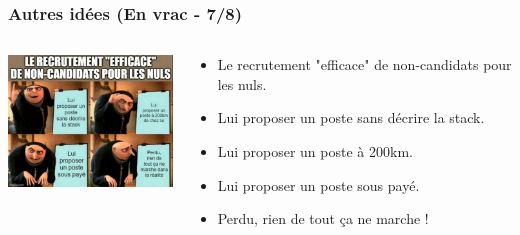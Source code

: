 \documentclass[slidetop,11pt]{beamer}
\begin{document}
\begin{frame}
	\frametitle{Autres id{\'e}es (En vrac - 7/8)}
	\begin{columns}[T]
	\begin{column}[T]{5cm}
		\includegraphics[width=5cm]{img/1687203978939.jpeg}~\\
	\end{column}
	\begin{column}[T]{8cm}
		\begin{itemize}
			\item Le recrutement "efficace" de non-candidats pour les nuls.~\newline
			\item Lui proposer un poste sans d{\'e}crire la stack. 
			\item Lui proposer un poste {\`a} 200km. 
			\item Lui proposer un poste sous pay{\'e}.~\newline
			\item Perdu, rien de tout \c{c}a ne marche ! 
		\end{itemize}%
	\end{column}
	\end{columns}
\end{frame}
\end{document}
